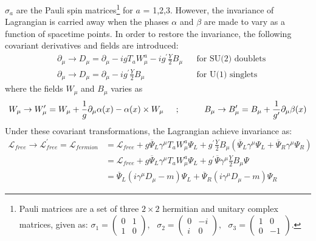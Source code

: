 $\sigma_{a}$ are the Pauli spin matrices\footnote{Pauli matrices are a set of three 
$2\times2$ hermitian and unitary complex matrices, given as:
\newline
$\sigma_{1} = \left(\begin{array}{cc} 0 & 1 \\ 1 & 0 \end{array}\right),\:\:\:
\sigma_{2} = \left(\begin{array}{cc} 0 & -i \\ i & 0 \end{array}\right),\:\:\:
\sigma_{3} = \left(\begin{array}{cc} 1 & 0 \\ 0 & -1 \end{array}\right).$}
for $a$ = 1,2,3. However, the invariance
of Lagrangian is carried away when the phases $\alpha$ and $\beta$ are made to vary as a function of spacetime points. In order to restore the invariance,
the following covariant derivatives and fields are introduced:
\begin{equation}
  \begin{split}
    & \partial_{\mu} \rightarrow D_{\mu} = \partial_{\mu} - igT_{a}W_{\mu}^{a} - ig^{\prime}\frac{Y}{2}B_{\mu} & & \textrm{for SU(2) doublets}\\
    & \partial_{\mu} \rightarrow D_{\mu} = \partial_{\mu} - ig^{\prime}\frac{Y}{2}B_{\mu} & & \textrm{for U(1) singlets}
    \label{eg:EWKdelToD}
    \end{split}
\end{equation}
where the fields $W_{\mu}$ and $B_{\mu}$ varies as
\begin{equation}
W_{\mu} \rightarrow W^{\prime}_{\mu} = W_{\mu} + \frac{1}{g}\partial_{\mu}\alpha(x) - \alpha(x) \times W_{\mu} \hspace{0.2in} ; \hspace{0.4in} B_{\mu} \rightarrow B^{\prime}_{\mu} = B_{\mu} + \frac{1}{g^{\prime}}\partial_{\mu}\beta(x) 
\label{eg:EWKfields}
\end{equation}
Under these covariant transformations, the Lagrangian achieve invariance as:
\begin{equation}
\begin{split}
  \mathcal{L}_{free} \rightarrow \mathcal{L}^{\prime}_{free} = \mathcal{L}_{fermion} & = \mathcal{L}_{free} + g\overline{\Psi}_{L}\gamma^{\mu}T_{a}W_{\mu}^{a}{\Psi_{L}} + g^{\prime}\frac{Y}{2}B_{\mu}(\overline{\Psi}_{L}\gamma^{\mu}{\Psi_{L}} + \overline{\Psi}_{R}\gamma^{\mu}{\Psi_{R}}) \\
  & = \mathcal{L}_{free} + g\overline{\Psi}_{L}\gamma^{\mu}T_{a}W_{\mu}^{a}{\Psi_{L}} + g^{\prime}\overline{\Psi}\gamma^{\mu}\frac{Y}{2}B_{\mu}{\Psi} \\
  & = \overline{\Psi}_{L}(i\gamma^{\mu}D_{\mu} - m){\Psi}_{L} + \overline{\Psi}_{R}(i\gamma^{\mu}D_{\mu} - m){\Psi}_{R}
  \label{eg:newLang}
\end{split}
\end{equation}
